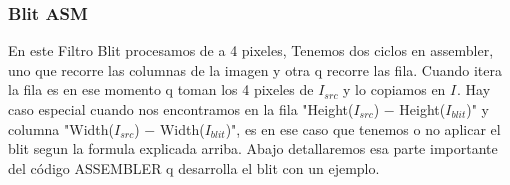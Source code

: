 		
			  
			  
			  

		 
			  


			  
			  
			  
			  


			  




\subsubsection*{Blit ASM}


En este Filtro Blit procesamos de a 4 pixeles, Tenemos dos ciclos en assembler, uno que recorre las columnas de la imagen y otra q recorre las fila.
Cuando itera la fila es en ese momento q toman los 4 pixeles de $I_{src}$ y lo copiamos en $I_{}$.
Hay caso especial cuando nos encontramos en la fila "Height($I_{src}$) $-$ Height($I_{blit}$)" y columna "Width($I_{src}$) $-$ Width($I_{blit}$)", es en ese caso que tenemos o no aplicar el blit segun la formula explicada arriba.
Abajo detallaremos esa parte importante del código ASSEMBLER q desarrolla el blit con un ejemplo.	

